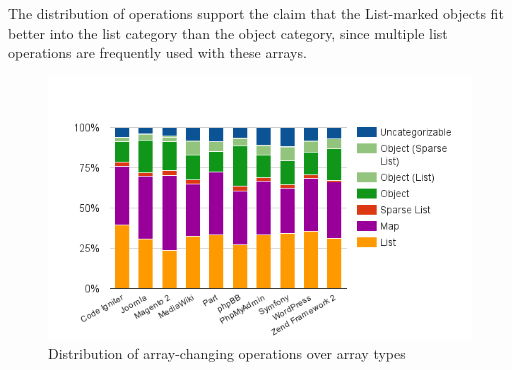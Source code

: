 The distribution of operations support the claim that the List-marked objects fit better into the list category than the object category, since multiple list operations are frequently used with these arrays.

\begin{figure}[htbp]
\centering
\includegraphics[width=\textwidth]{chapters/study/g22.png}
\caption{Distribution of array-changing operations over array types}
\label{fig:type_operations}
\end{figure}
